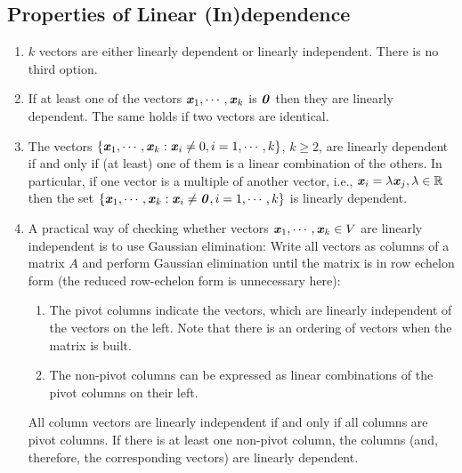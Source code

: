 \subsection{Properties of Linear (In)dependence}
\begin{enumerate}
    \item $k$ vectors are either linearly dependent or linearly independent. There is no third option.
    \hfill \cite{mfml/book/mml/Deisenroth-Faisal-Ong}

    \item If at least one of the vectors $\text{\textbf{\textit{x}}}_1, \cdots , \text{\textbf{\textit{x}}}_k$ is $\text{\textbf{\textit{0}}}$ then they are linearly dependent. 
    The same holds if two vectors are identical.
    \hfill \cite{mfml/book/mml/Deisenroth-Faisal-Ong}

    \item The vectors $\left\{\text{\textbf{\textit{x}}}_1, \cdots , \text{\textbf{\textit{x}}}_k : \text{\textbf{\textit{x}}}_i \neq 0, i = 1, \cdots , k\right\}$, $k \geq 2$, are linearly dependent if and only if (at least) one of them is a linear combination of the others. 
    In particular, if one vector is a multiple of another vector, i.e., $\text{\textbf{\textit{x}}}_i = \lambda \text{\textbf{\textit{x}}}_j , \lambda \in \mathbb{R}$ then the set $\left\{\text{\textbf{\textit{x}}}_1, \cdots , \text{\textbf{\textit{x}}}_k : \text{\textbf{\textit{x}}}_i \neq \text{\textbf{\textit{0}}}, i = 1, \cdots , k\right\}$ is linearly dependent.
    \hfill \cite{mfml/book/mml/Deisenroth-Faisal-Ong}

    \item A practical way of checking whether vectors $\text{\textbf{\textit{x}}}_1, \cdots , \text{\textbf{\textit{x}}}_k \in V$ are linearly independent is to use Gaussian elimination: 
    Write all vectors as columns of a matrix $A$ and perform Gaussian elimination until the matrix is in row echelon form (the reduced row-echelon form is unnecessary here):
    \hfill \cite{mfml/book/mml/Deisenroth-Faisal-Ong}
    \begin{enumerate}
        \item The pivot columns indicate the vectors, which are linearly independent of the vectors on the left. Note that there is an ordering of vectors when the matrix is built.
        \hfill \cite{mfml/book/mml/Deisenroth-Faisal-Ong}

        \item The non-pivot columns can be expressed as linear combinations of the pivot columns on their left.
        \hfill \cite{mfml/book/mml/Deisenroth-Faisal-Ong}
    \end{enumerate}

    All column vectors are linearly independent if and only if all columns are pivot columns. If there is at least one non-pivot column, the columns (and, therefore, the corresponding vectors) are linearly dependent.
    \hfill \cite{mfml/book/mml/Deisenroth-Faisal-Ong}


\end{enumerate}
